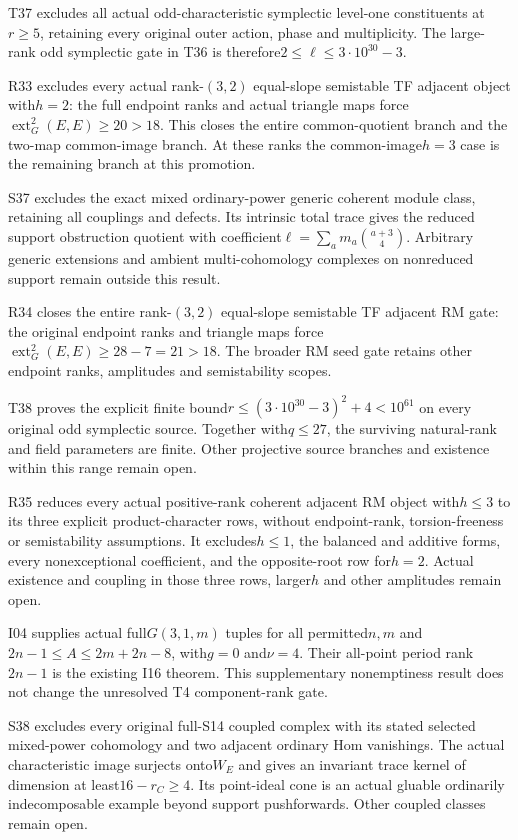 T37 excludes all actual odd-characteristic symplectic level-one constituents at$r\ge5$, retaining every original outer action, phase and multiplicity. The large-rank odd symplectic gate in T36 is therefore$2\le\ell\le3\cdot10^{30}-3$.


R33 excludes every actual rank-$(3,2)$ equal-slope semistable TF adjacent object with$h=2$: the full endpoint ranks and actual triangle maps force$\operatorname{ext}^2_G(E,E)\ge20>18$. This closes the entire common-quotient branch and the two-map common-image branch. At these ranks the common-image$h=3$ case is the remaining branch at this promotion.


S37 excludes the exact mixed ordinary-power generic coherent module class, retaining all couplings and defects. Its intrinsic total trace gives the reduced support obstruction quotient with coefficient$\ell=\sum_a m_a\binom{a+3}{4}$. Arbitrary generic extensions and ambient multi-cohomology complexes on nonreduced support remain outside this result.


R34 closes the entire rank-$(3,2)$ equal-slope semistable TF adjacent RM gate: the original endpoint ranks and triangle maps force$\operatorname{ext}^2_G(E,E)\ge28-7=21>18$. The broader RM seed gate retains other endpoint ranks, amplitudes and semistability scopes.


T38 proves the explicit finite bound$r\le(3\cdot10^{30}-3)^2+4<10^{61}$ on every original odd symplectic source. Together with$q\le27$, the surviving natural-rank and field parameters are finite. Other projective source branches and existence within this range remain open.


R35 reduces every actual positive-rank coherent adjacent RM object with$h\le3$ to its three explicit product-character rows, without endpoint-rank, torsion-freeness or semistability assumptions. It excludes$h\le1$, the balanced and additive forms, every nonexceptional coefficient, and the opposite-root row for$h=2$. Actual existence and coupling in those three rows, larger$h$ and other amplitudes remain open.


I04 supplies actual full$G(3,1,m)$ tuples for all permitted$n,m$ and$2n-1\le A\le2m+2n-8$, with$g=0$ and$\nu=4$. Their all-point period rank$2n-1$ is the existing I16 theorem. This supplementary nonemptiness result does not change the unresolved T4 component-rank gate.


S38 excludes every original full-S14 coupled complex with its stated selected mixed-power cohomology and two adjacent ordinary Hom vanishings. The actual characteristic image surjects onto$W_E$ and gives an invariant trace kernel of dimension at least$16-r_C\ge4$. Its point-ideal cone is an actual gluable ordinarily indecomposable example beyond support pushforwards. Other coupled classes remain open.


